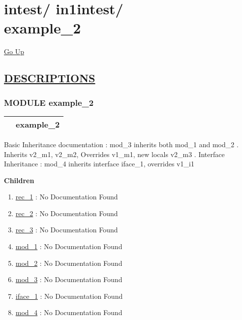 \chapter*{\color{headfile}
{\large intest\slash\hspace{0pt}}
{\large in1intest\slash\hspace{0pt}}
 \\
example_2
}
\hypertarget{ecldoc:toc:intest.in1intest.example_2}{}
\hyperlink{ecldoc:toc:root/intest/in1intest}{Go Up}


\section*{\underline{\textsf{DESCRIPTIONS}}}
\subsection*{\textsf{\colorbox{headtoc}{\color{white} MODULE}
example\_2}}

\hypertarget{ecldoc:intest.in1intest.example_2}{}

{\renewcommand{\arraystretch}{1.5}
\begin{tabularx}{\textwidth}{|>{\raggedright\arraybackslash}l|X|}
\hline
\hspace{0pt}\mytexttt{\color{red} } & \textbf{example\_2} \\
\hline
\end{tabularx}
}

\par





Basic Inheritance documentation : mod\_3 inherits both mod\_1 and mod\_2 . Inherits v2\_m1, v2\_m2, Overrides v1\_m1, new locals v2\_m3 . Interface Inheritance : mod\_4 inherits interface iface\_1, overrides v1\_i1







\textbf{Children}
\begin{enumerate}
\item \hyperlink{ecldoc:intest.in1intest.example_2.rec_1}{rec\_1}
: No Documentation Found
\item \hyperlink{ecldoc:intest.in1intest.example_2.rec_2}{rec\_2}
: No Documentation Found
\item \hyperlink{ecldoc:intest.in1intest.example_2.rec_3}{rec\_3}
: No Documentation Found
\item \hyperlink{ecldoc:intest.in1intest.example_2.mod_1}{mod\_1}
: No Documentation Found
\item \hyperlink{ecldoc:intest.in1intest.example_2.mod_2}{mod\_2}
: No Documentation Found
\item \hyperlink{ecldoc:intest.in1intest.example_2.mod_3}{mod\_3}
: No Documentation Found
\item \hyperlink{ecldoc:intest.in1intest.example_2.iface_1}{iface\_1}
: No Documentation Found
\item \hyperlink{ecldoc:intest.in1intest.example_2.mod_4}{mod\_4}
: No Documentation Found
\end{enumerate}

